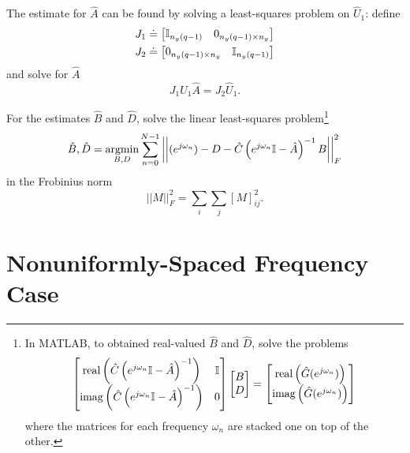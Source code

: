 The estimate for $\hat{A}$ can be found by solving a least-squares problem on $\hat{U}_1$: define
\begin{equation*}
  \begin{aligned}
    J_1 & \doteq
          \begin{bmatrix}
            \mathbb{I}_{n_y(q-1)} & 0_{n_y(q-1)\times n_y}
          \end{bmatrix} \\
    J_2 & \doteq
          \begin{bmatrix}
            0_{n_y(q-1)\times n_y} & \mathbb{I}_{n_y(q-1)}
          \end{bmatrix}
  \end{aligned}
\end{equation*}
and solve for $\hat{A}$
\begin{equation*}
  J_1\hat{U}_1\hat{A} = J_2\hat{U}_1.
\end{equation*}

For the estimates $\hat{B}$ and $\hat{D}$, solve the linear least-squares problem\footnote{In MATLAB, to obtained real-valued $\hat{B}$ and $\hat{D}$, solve the problems
  \begin{equation*}
    \begin{bmatrix}
      \textrm{real}\left(\hat{C}\left(e^{j\omega_n}\mathbb{I} - \hat{A}\right)^{-1}\right) & \mathbb{I} \\
      \textrm{imag}\left(\hat{C}\left(e^{j\omega_n}\mathbb{I} - \hat{A}\right)^{-1}\right) & 0
    \end{bmatrix}
    \begin{bmatrix}
      B \\ D
    \end{bmatrix} =
    \begin{bmatrix}
      \textrm{real}\left(\hat{G}(e^{j\omega_n})\right) \\
      \textrm{imag}\left(\hat{G}(e^{j\omega_n})\right)
    \end{bmatrix}
  \end{equation*}
  where the matrices for each frequency $\omega_n$ are stacked one on top of the other.}
\begin{equation*}
  \hat{B},\hat{D} = \operatorname*{argmin}_{B,D} \sum_{n=0}^{N-1}\left|\left| (e^{j\omega_n}) - D - \hat{C}\left(e^{j\omega_n}\mathbb{I} - \hat{A}\right)^{-1}B\right|\right|_F^2
\end{equation*}
in the Frobinius norm
\begin{equation*}
  ||M||_F^2 = \sum_i\sum_j [M]_{ij}^2.
\end{equation*}

\section{Nonuniformly-Spaced Frequency Case}

